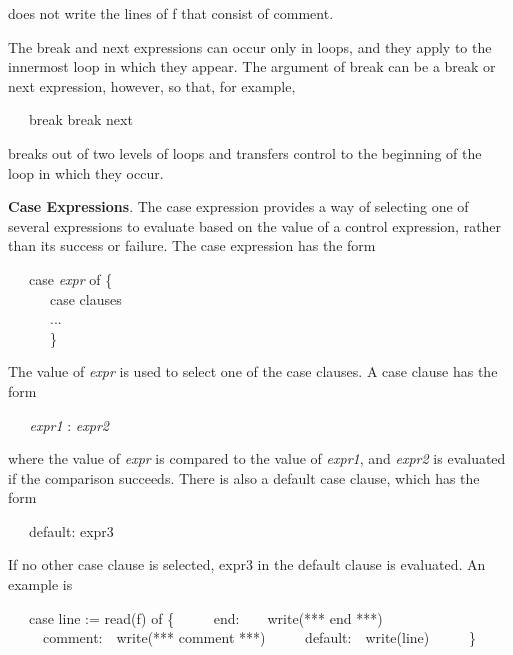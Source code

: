 
\noindent does not write the lines of f that consist of
{\textquotedbl}comment{\textquotedbl}.

The break and next expressions can occur only in loops, and they apply
to the innermost loop in which they appear. The argument of break can
be a break or next expression, however, so that, for example,

{\ttfamily\mdseries
\ \ \ break break next}

\noindent breaks out of two levels of loops and transfers control to
the beginning of the loop in which they occur.


\textbf{Case Expressions}. The case expression provides a way of
selecting one of several expressions to evaluate based on the value of
a control expression, rather than its success or failure. The case
expression has the form

{\ttfamily\mdseries
\ \ \ case \textit{expr} of \{\\
\ \ \ \ \ \ case clauses \\
\ \ \ \ \ \ ... \\
\ \ \ \ \ \ \}}

The value of \textit{expr }is used to select one of the case
clauses. A case clause has the form

{\ttfamily\mdseries
\textit{\ \ \ expr1 }: \textit{expr2}}

\noindent where the value of \textit{expr} is compared to the value of
\textit{expr1}, and \textit{expr2} is evaluated if the comparison
succeeds. There is also a default case clause, which has the form

{\ttfamily\mdseries
\ \ \ default: expr3}


If no other case clause is selected, expr3 in the default clause is
evaluated. An example is

{\ttfamily\mdseries
\ \ \ case line := read(f) of \{\newline
 \ \ \ \ \ {\textquotedbl}end{\textquotedbl}:\ \ \ \ write({\textquotedbl}*** end ***{\textquotedbl})\newline
 \ \ \ \ \ {\textquotedbl}comment{\textquotedbl}:\ \ write({\textquotedbl}*** comment ***{\textquotedbl})\newline
 \ \ \ \ \ default:\ \ write(line)\newline
 \ \ \ \ \ \}}


